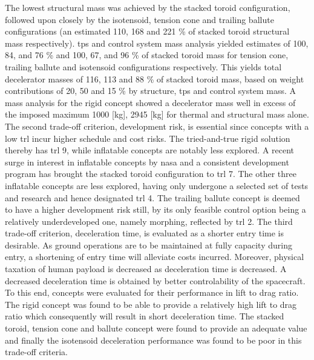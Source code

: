 The lowest structural mass was achieved by the stacked toroid configuration, followed upon closely by the isotensoid, tension cone and trailing ballute configurations (an estimated 110, 168 and 221 \% of stacked toroid structural mass respectively). \acrfull{tps} and control system mass analysis yielded estimates of 100, 84, and 76 \% and 100, 67, and 96 \% of stacked toroid mass for tension cone, trailing ballute and isotensoid configurations respectively. This yields total decelerator masses of 116, 113 and 88 \% of stacked toroid mass, based on weight contributions of 20, 50 and 15 \% by structure, \gls{tps} and control system mass. A mass analysis for the rigid concept showed a decelerator mass well in excess of the imposed maximum 1000 [kg], 2945 [kg] for thermal and structural mass alone.
\newline
\newline
The second trade-off criterion, development risk, is essential since concepts with a low \acrfull{trl} incur higher schedule and cost risks. The tried-and-true rigid solution thereby has \gls{trl} 9, while inflatable concepts are notably less explored. A recent surge in interest in inflatable concepts by \gls{nasa} and a consistent development program has brought the stacked toroid configuration to \gls{trl} 7. The other three inflatable concepts are less explored, having only undergone a selected set of tests and research and hence designated \gls{trl} 4. The trailing ballute concept is deemed to have a higher development risk still, by its only feasible control option being a relatively underdeveloped one, namely morphing, reflected by \gls{trl} 2.
\newline
\newline
The third trade-off criterion, deceleration time, is evaluated as a shorter entry time is desirable. As ground operations are to be maintained at fully capacity during entry, a shortening of entry time will alleviate costs incurred. Moreover, physical taxation of human payload is decreased as deceleration time is decreased.  A decreased deceleration time is obtained by better controlability of the spacecraft. To this end, concepts were evaluated for their performance in lift to drag ratio. The rigid concept was found to be able to provide a relatively high lift to drag ratio which consequently will result in short deceleration time. The stacked toroid, tension cone and ballute concept were found to provide an adequate value and finally the isotensoid deceleration performance was found to be poor in this trade-off criteria.
\newline

